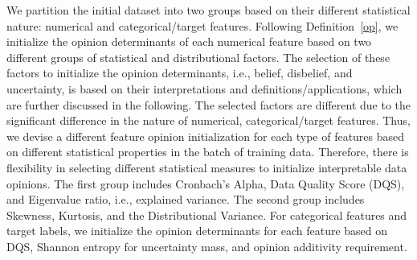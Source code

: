 



We partition the initial dataset into two groups based on their different statistical nature: numerical and categorical/target features. Following Definition~\ref{op}, we initialize the opinion determinants of each numerical feature based on two different groups of statistical and distributional factors. {\color{blue} The selection of these factors to initialize the opinion determinants, i.e., belief, disbelief, and uncertainty, is based on their interpretations and definitions/applications, which are further discussed in the following. The selected factors are different due to the significant difference in the nature of numerical, categorical/target features. Thus, we devise a different feature opinion initialization for each type of features based on different statistical properties in the batch of training data. Therefore, there is flexibility in selecting different statistical measures to initialize interpretable data opinions.}
The first group includes Cronbach's Alpha, Data Quality Score (DQS), and Eigenvalue ratio, i.e., explained variance. The second group includes Skewness, Kurtosis, and the Distributional Variance. 
For categorical features and target labels, we initialize the opinion determinants for each feature based on DQS, Shannon entropy for uncertainty mass, and opinion additivity requirement.


